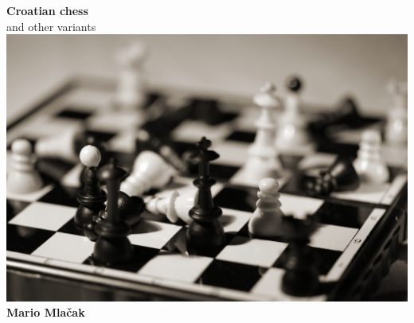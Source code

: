 \documentclass[b5paper,12pt,draft]{book}
\begin{document}
\begin{titlepage}
\begin{center}
\textbf{\huge{Croatian chess}} \\
        \large{and other variants} \\ [2.0cm]
\includegraphics[width=\textwidth, keepaspectratio=true]{../gfx/crochess.jpg} \\ [2.0cm]
\textbf{\large{Mario Mlačak}} \\ [2.0cm]
\end{center}
\end{titlepage}

\end{document}

